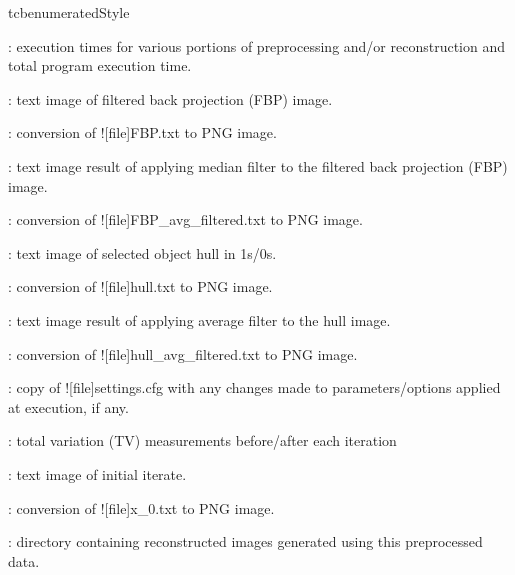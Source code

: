 \begin{tcbenvironment}
\begin{tcbparbox}{tcbenumeratedStyle}
\begin{ThinEnum}
\begin{ThinEnum}
\begin{ThinEnum}
\begin{ThinEnum}
\begin{ThinEnum}
\begin{ThinEnum}
\begin{ThinEnum}
\begin{ThinEnum}
                                    \begin{ThinEnum}
                                            \item {} : execution times for various portions of preprocessing and/or reconstruction and total program execution time.
                                            \item {} : text image of filtered back projection (FBP) image.
                                            \item {} : conversion of \docentry![file]{FBP.txt} to PNG image.
                                            \item {} : text image result of applying median filter to the filtered back projection (FBP) image.
                                            \item {} : conversion of \docentry![file]{FBP\_avg\_filtered.txt} to PNG image.
                                            \item {} : text image of selected object hull in 1s/0s.
                                            \item {} : conversion of \docentry![file]{hull.txt} to PNG image.
                                            \item {} : text image result of applying average filter to the hull image.
                            \item {} : conversion of \docentry![file]{hull\_avg\_filtered.txt} to PNG image.
                            \item {} : copy of \docentry![file]{settings.cfg} with any changes made to parameters/options applied at execution, if any.
                                            \item {} : total variation (TV) measurements before/after each iteration
                                            \item {} : text image of initial iterate.
                                        \item {} : conversion of \docentry![file]{x\_0.txt} to PNG image.
                                        \item {} : directory containing reconstructed images generated using this preprocessed data.

\end{ThinEnum}
\end{ThinEnum}
\end{ThinEnum}
\end{ThinEnum}
\end{ThinEnum}
\end{ThinEnum}
\end{ThinEnum}
\end{ThinEnum}
\end{ThinEnum}
\end{tcbparbox}
\end{tcbenvironment}
